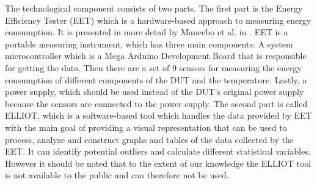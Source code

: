 The technological component consists of two parts. The first part is the Energy Efficiency Tester (EET) which is a hardware-based approach to measuring energy consumption. It is presented in more detail by Mancebo et al. in \cite*{GarciaEET}. EET is a portable measuring instrument, which has three main components: A system microcontroller which is a Mega Arduino Development Board that is responsible for getting the data. Then there are a set of 9 sensors for measuring the energy consumption of different components of the DUT and the temperature. Lastly, a power supply, which should be used instead of the DUT's original power supply because the sensors are connected to the power supply.\cite*{GarciaEET} The second part is called ELLIOT, which is a software-based tool which handles the data provided by EET with the main goal of providing a visual representation that can be used to process, analyze and construct graphs and tables of the data collected by the EET. It can identify potential outliers and calculate different statistical variables.\cite{GarciaFEETINGS} However it should be noted that to the extent of our knowledge the ELLIOT tool is not available to the public and can therefore not be used.

